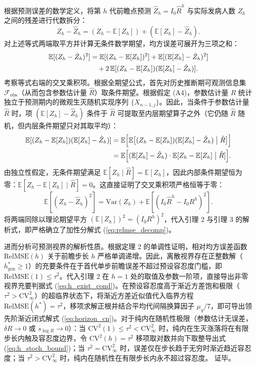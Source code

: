 \documentclass[11pt,a4paper]{article}
\theoremstyle{plain}
\theoremstyle{definition}
\begin{document}
根据预测误差的数学定义，将第 $h$ 代前瞻点预测 $\hat{Z}_h = I_0 \hat{R}^h$ 与实际发病人数 $Z_h$ 之间的残差进行代数拆分：
\begin{equation}
Z_h - \hat{Z}_h = (Z_h - \mathbb{E}[Z_h]) + (\mathbb{E}[Z_h] - \hat{Z}_h).
\end{equation}
对上述等式两端取平方并计算无条件数学期望，均方误差可展开为三项之和：
\begin{align}
\mathbb{E}[(Z_h - \hat{Z}_h)^2] &= \mathbb{E}[(Z_h - \mathbb{E}[Z_h])^2] + \mathbb{E}[(\mathbb{E}[Z_h] - \hat{Z}_h)^2] \notag \\
&\quad + 2\,\mathbb{E}[(Z_h - \mathbb{E}[Z_h])(\mathbb{E}[Z_h] - \hat{Z}_h)].
\end{align}
考察等式右端的交叉乘积项。根据全期望公式，首先对历史推断期可观测信息集 $\mathcal{F}_{\text{obs}}$（从而包含参数估计量 $\hat{R}$）取条件期望。根据假定 (A4)，参数估计量 $\hat{R}$ 统计独立于预测期内的微观生灭随机实现序列 $\{X_{n-1, j}\}$。因此，当条件于参数估计量 $\hat{R}$ 时，项 $(\mathbb{E}[Z_h] - \hat{Z}_h)$ 条件于 $\hat{R}$ 可提取至内层期望算子之外（它仍随 $\hat{R}$ 随机，但内层条件期望只对其取平均）：
\begin{align}
\mathbb{E}[(Z_h - \mathbb{E}[Z_h])(\mathbb{E}[Z_h] - \hat{Z}_h)] &= \mathbb{E}\Big[ \mathbb{E}\big[ (Z_h - \mathbb{E}[Z_h])(\mathbb{E}[Z_h] - \hat{Z}_h) \;\big|\; \hat{R} \big] \Big] \notag \\
&= \mathbb{E}\Big[ (\mathbb{E}[Z_h] - \hat{Z}_h) \cdot \mathbb{E}[ Z_h - \mathbb{E}[Z_h] \;\big|\; \hat{R} ] \Big].
\end{align}
由独立性假定，无条件期望满足 $\mathbb{E}[Z_h \mid \hat{R}] = \mathbb{E}[Z_h]$，因此内部条件期望恒为零：$\mathbb{E}[Z_h - \mathbb{E}[Z_h] \mid \hat{R}] = 0$。这直接证明了交叉乘积项严格恒等于零：
\begin{equation}
\mathbb{E}[(Z_h - \hat{Z}_h)^2] = \text{Var}(Z_h) + \mathbb{E}[(I_0 \hat{R}^h - I_0 R^h)^2].
\end{equation}
将两端同除以理论期望平方 $(\mathbb{E}[Z_h])^2 = (I_0 R^h)^2$，代入引理 2 与引理 3 的解析式，即严格确立了加性分解式 (\ref{eq:relmse_decomp})。

进而分析可预测视界的解析性质。根据定理 2 的单调性证明，相对均方误差函数 $\text{RelMSE}(h)$ 关于前瞻步长 $h$ 严格单调递增。因此，离散视界存在正整数解（$h^*_{\text{gen}} \ge 1$）的充要条件在于首代单步前瞻误差不超过预设容忍度门槛，即 $\text{RelMSE}(1) \le \tau^2$。代入引理 2 在 $h=1$ 处的取值及参数一阶项，直接导出非零视界充要判据式 (\ref{eq:h_exist_cond})。在预设容忍度高于渐近方差饱和极限（$\tau^2 > \text{CV}^2_\infty$）的超临界状态下，将渐近方差近似值代入临界方程 $\text{RelMSE}(h^*) = \tau^2$，移项求解正根并结合平均代间隔换算因子 $\mu_g/7$，即可导出领先阶渐近闭式解式 (\ref{eq:horizon_cn})。对于纯内在随机性极限（参数估计无误差，$\delta R \to 0$ 或 $s_{\log R} \to 0$）：当 $\text{CV}^2(1) \le \tau^2 < \text{CV}^2_\infty$ 时，纯内在生灭涨落将在有限步长内触及容忍度边界，令 $\text{CV}^2(h) = \tau^2$ 移项取对数并向下取整导出式 (\ref{eq:h_stoch_bound})；当 $\tau^2 = \text{CV}^2_\infty$ 时，误差仅在步长趋于无穷时渐近趋近容忍度；当 $\tau^2 > \text{CV}^2_\infty$ 时，纯内在随机性在有限步长内永不超过容忍度。
证毕。
\end{document}
